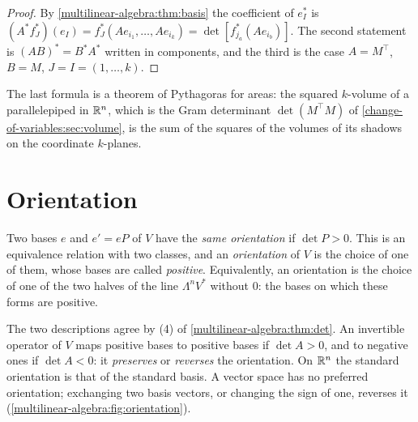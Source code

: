 \begin{notechapter}
\begin{proof}
By \cref{multilinear-algebra:thm:basis} the coefficient of $e_I^*$ is
$(A^*f_J^*)(e_I) = f_J^*(Ae_{i_1},\dots,Ae_{i_k})
= \det[f_{j_a}^*(Ae_{i_b})]$. The second statement is
$(AB)^* = B^*A^*$ written in components, and the third is the case
$A = M^\top$, $B = M$, $J = I = (1,\dots,k)$.
\end{proof}

The last formula is a theorem of Pythagoras for areas: the squared
$k$-volume of a parallelepiped in $\mathbb{R}^n$, which is the Gram determinant
$\det(M^\top M)$ of \cref{change-of-variables:sec:volume}, is the sum of
the squares of the volumes of its shadows on the coordinate $k$-planes.

\section{Orientation}\label{multilinear-algebra:sec:orientation}

\begin{definition}[Orientation]\label{multilinear-algebra:def:orientation}
Two bases $e$ and $e' = eP$ of $V$ have the \emph{same orientation} if
$\det P > 0$. This is an equivalence relation with two classes, and an
\emph{orientation} of $V$ is the choice of one of them, whose bases are
called \emph{positive}. Equivalently, an orientation is the choice of
one of the two halves of the line $\Lambda^nV^*$ without $0$: the bases
on which these forms are positive.
\end{definition}

The two descriptions agree by (4) of
\cref{multilinear-algebra:thm:det}. An invertible operator of $V$ maps
positive bases to positive bases if $\det A > 0$, and to negative ones
if $\det A < 0$: it \emph{preserves} or \emph{reverses} the orientation.
On $\mathbb{R}^n$ the standard orientation is that of the standard basis. A
vector space has no preferred orientation; exchanging two basis
vectors, or changing the sign of one, reverses it
(\cref{multilinear-algebra:fig:orientation}).


\end{notechapter}
